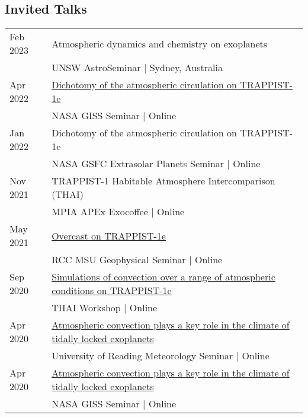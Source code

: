 \documentclass[a4paper, 11pt]{article}
\begin{document}
\subsection*{Invited Talks}
\begin{tabularx}{\linewidth}{@{}l X@{}}
Feb 2023 & Atmospheric dynamics and chemistry on exoplanets \\ & UNSW AstroSeminar | Sydney, Australia \\
Apr 2022 & \href{https://youtu.be/0uDBIp_EQrg}{Dichotomy of the atmospheric circulation on TRAPPIST-1e} \\ & NASA GISS Seminar | Online \\
Jan 2022 & Dichotomy of the atmospheric circulation on TRAPPIST-1e \\ & NASA GSFC Extrasolar Planets Seminar | Online \\
Nov 2021 & TRAPPIST-1 Habitable Atmosphere Intercomparison (THAI) \\ & MPIA APEx Exocoffee | Online \\
May 2021 & \href{https://youtu.be/ZUfIK-HMgLw}{Overcast on TRAPPIST-1e} \\ & RCC MSU Geophysical Seminar | Online \\
Sep 2020 & \href{https://youtu.be/E4UAoCoI1x8}{Simulations of convection over a range of atmospheric conditions on TRAPPIST-1e} \\ & THAI Workshop | Online \\
Apr 2020 & \href{https://slides.com/denissergeev/2020-04-27-uor-met}{Atmospheric convection plays a key role in the climate of tidally locked exoplanets} \\ & University of Reading Meteorology Seminar | Online \\
Apr 2020 & \href{https://slides.com/denissergeev/2020-04-21-nasa-giss}{Atmospheric convection plays a key role in the climate of tidally locked exoplanets} \\ & NASA GISS Seminar | Online \\
\end{tabularx}
\vspace{1ex}
\end{document}
